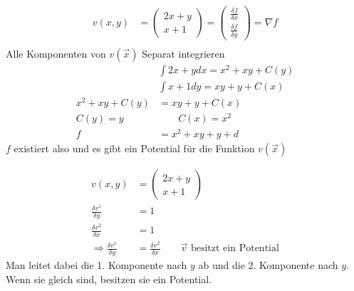 \documentclass[a4paper]{article}
\begin{document}
	\begin{multicols}{2}
		\begin{fmerke}
			\begin{align*}
				v(x,y) &= \left( \begin{array}{c}
								2x + y \\
								x + 1
								\end{array} \right) = \left( \begin{array}{c} 
																\frac{\delta f}{\delta x} \\
																\frac{\delta f}{\delta y}
															\end{array} \right) = \nabla f \\
			\end{align*}
				Alle Komponenten von $v(\vec x)$ Separat integrieren
			\begin{align*}
						& \int 2x + y dx = x^2 + xy + C(y) \\
						& \int x+ 1 dy   = xy + y + C(x) \\
						x^2 + xy + C(y) &= xy + y + C(x) \\
						C(y) = y \qquad & \qquad C(x) = x^2\\
						f &= x^2 + xy + y + d
			\end{align*}
			$f$ existiert also und es gibt ein Potential für die Funktion $v(\vec x)$
		\end{fmerke}

		\begin{fmerke}
			\begin{align*}
				v(x,y) &= \left( \begin{array}{c}
								2x + y \\
								x + 1
								\end{array} \right) \\
				\frac{\delta v^1}{\delta y} &= 1\\
				\frac{\delta v^2}{\delta x} &= 1\\
				\Longrightarrow \frac{\delta v^1}{\delta y} &=  \frac{\delta v^2}{\delta x} \qquad \vec v \text{ besitzt ein Potential}
			\end{align*}
			Man leitet dabei die 1. Komponente nach $y$ ab und die 2. Komponente nach $y$. Wenn sie gleich sind, besitzen sie ein Potential.
		\end{fmerke}
	\end{multicols}
\end{document}
